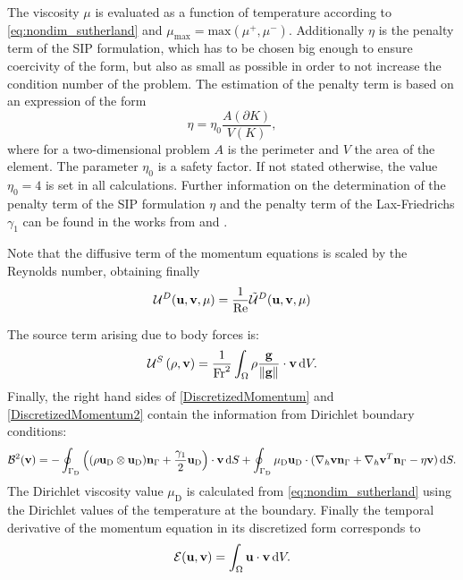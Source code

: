 The viscosity $\mu$ is evaluated as a function of temperature according to \cref{eq:nondim_sutherland} and $\mu_{\text{max}} = \text{max}(\mu^{+}, \mu^{-})$.  Additionally  $\eta$ is the penalty term of the \gls{SIP} formulation, which has to be chosen big enough to ensure coercivity of the form, but also as small as possible in order to not increase the condition number of the problem. The estimation of the penalty term is based on an expression of the form
\begin{equation}
	\eta = \eta_0 \frac{A(\partial K)}{V(K)},
\end{equation}\label{eq:PenaltyFactor}
where for a two-dimensional problem $A$ is the perimeter and $V$ the area of the element. The parameter $\eta_0$ is a safety factor. If not stated otherwise, the value  $\eta_0 = 4$ is  set in all calculations. Further information on the determination of the penalty term of the SIP formulation $\eta$ and the penalty term of the Lax-Friedrichs $\gamma_1 $ can be found in  the works from \textcite{hesthavenNodalDiscontinuousGalerkin2008} and \textcite{hillewaertDevelopmentDiscontinuousGalerkin2013}.

Note that the diffusive term of the momentum equations is scaled by the Reynolds number, obtaining finally
\begin{equation}
		\mathcal{U}^D(\textbf{u},\textbf{v},\mu) = 	\frac{1}{\text{Re}}\tilde{\mathcal{U}}^D(\textbf{u},\textbf{v},\mu)
\end{equation}

The source term arising due to body forces is:
\begin{equation}
	\mathcal{U}^S\left(\rho, \textbf{v}\right) =  \smash{\frac{1}{\text{Fr}^2}}\int_{\Omega}{  \rho \frac{\textbf{g}}{\Vert \textbf{g} \Vert}\cdot \textbf{v}} \,\mathrm{d} V.  \label{eq:Mom_source}
\end{equation}
Finally, the right hand sides of \cref{DiscretizedMomentum} and \cref{DiscretizedMomentum2} contain the information from Dirichlet boundary conditions:
\begin{equation}
	\mathcal{B}^2(\textbf{v}) =
	-\oint_{\Gamma_{\text{D}}}{ \left( (\rho\textbf{u}_{\text{D}}\otimes\textbf{u}_{\text{D}} )\textbf{n}_{\Gamma} + \frac{\gamma_1}{2}\textbf{u}_{\text{D}}\right)\cdot\textbf{v} \,\mathrm{d} S}  +
	\oint_{\Gamma_{\text{D}}}{\mu_{\text{D}}\textbf{u}_{\text{D}}\cdot(\nabla_h\textbf{v} \textbf{n}_{\Gamma} + \nabla_h\textbf{v}^T \textbf{n}_{\Gamma}- \eta \textbf{v} )\,\mathrm{d} S.}
\end{equation}
The Dirichlet viscosity value $\mu_{\text{D}}$ is calculated from \cref{eq:nondim_sutherland} using the Dirichlet values of the temperature at the boundary.
Finally the temporal derivative of the momentum equation in its discretized form corresponds to
\begin{equation}
\mathcal{E} (\textbf{u},\textbf{v}) =   \int_{\Omega}{\textbf{u}\cdot\textbf{v}} \,\mathrm{d} V.
\end{equation}
